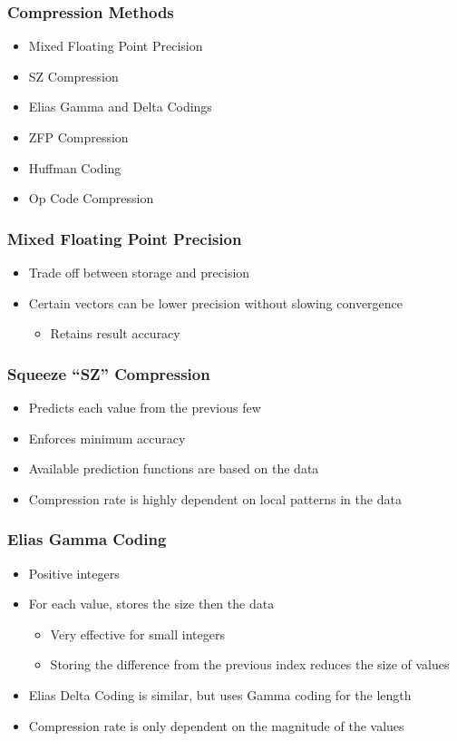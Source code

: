 \documentclass{beamer}
\begin{document}
\begin{frame}
	\frametitle{Compression Methods}
	\begin{itemize}
		\item<1-2> Mixed Floating Point Precision
		\item<1-2> SZ Compression
		\item<1-2> Elias Gamma and Delta Codings
		\item<1> ZFP Compression
		\item<1> Huffman Coding
		\item<1> Op Code Compression
	\end{itemize}
\end{frame}

\begin{frame}
	\frametitle{Mixed Floating Point Precision}
	\begin{itemize}
		\item Trade off between storage and precision
		\item Certain vectors can be lower precision without slowing convergence
		\begin{itemize}
			\item Retains result accuracy
		\end{itemize}
	\end{itemize}
\end{frame}

\begin{frame}
	\frametitle{Squeeze ``SZ'' Compression}
	\begin{itemize}
		\item Predicts each value from the previous few
		\item Enforces minimum accuracy
		\pause
		\item Available prediction functions are based on the data
		\pause
		\item Compression rate is highly dependent on local patterns in the data
	\end{itemize}
\end{frame}

\begin{frame}
	\frametitle{Elias Gamma Coding}
	\begin{itemize}
		\item Positive integers
		\item For each value, stores the size then the data
		\begin{itemize}
			\item Very effective for small integers
			\item Storing the difference from the previous index reduces the size of values
		\end{itemize}
		\pause
		\item Elias Delta Coding is similar, but uses Gamma coding for the length
		\pause
		\item Compression rate is only dependent on the magnitude of the values
	\end{itemize}
\end{frame}
\end{document}
